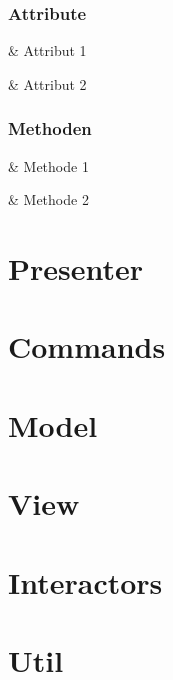 \subsubsection*{Attribute}

\begin{easylist}[itemize]

    & Attribut 1

    & Attribut 2

\end{easylist}

\subsubsection*{Methoden}

\begin{easylist}[itemize]

    & Methode 1

    & Methode 2

\end{easylist}

\section{Presenter}

\section{Commands}

\section{Model}

\section{View}

\section{Interactors}

\section{Util}